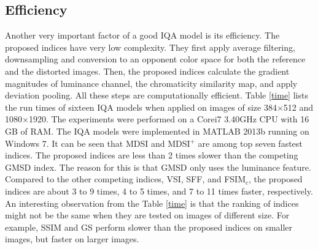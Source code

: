           




      


\subsection{Efficiency}
\label{efficiency}


Another very important factor of a good IQA model is its efficiency. The proposed indices have very low complexity. They first apply average filtering, downsampling and conversion to an opponent color space for both the reference and the distorted images. Then, the proposed indices calculate the gradient magnitudes of luminance channel, the chromaticity similarity map, and apply deviation pooling. All these steps are computationally efficient. Table \ref{time} lists the run times of sixteen IQA models when applied on images of size 384$\times$512 and 1080$\times$1920. The experiments were performed on a Corei7 3.40GHz CPU with 16 GB of RAM. The IQA models were implemented in MATLAB 2013b running on Windows 7. It can be seen that MDSI and MDSI$^+$ are among top seven fastest indices. The proposed indices are less than 2 times slower than the competing GMSD index. The reason for this is that GMSD only uses the luminance feature. Compared to the other competing indices, VSI, SFF, and FSIM$_c$, the proposed indices are about 3 to 9 times, 4 to 5 times, and 7 to 11 times faster, respectively. An interesting observation from the Table \ref{time} is that the ranking of indices might not be the same when they are tested on images of different size. For example, SSIM and GS perform slower than the proposed indices on smaller images, but faster on larger images. 


